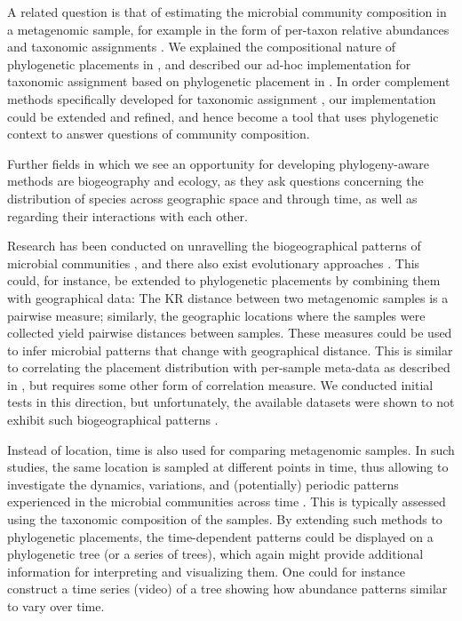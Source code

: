 A related question is that of estimating the microbial community composition in a metagenomic sample,
for example in the form of per-taxon relative abundances and taxonomic assignments \cite{Lindgreen2016}.
We explained the compositional nature of phylogenetic placements in
,
and described our ad-hoc implementation for taxonomic assignment based on phylogenetic placement in %
.
In order complement methods specifically developed for taxonomic assignment
\cite{Lindgreen2016,Sczyrba2017,Almeida2018},
our implementation could be extended and refined,
and hence become a tool that uses phylogenetic context to answer questions of community composition.


Further fields in which we see an opportunity for developing phylogeny-aware methods are biogeography and ecology,
as they ask questions concerning the distribution of species across geographic space and through time,
as well as regarding their interactions with each other.

Research has been conducted on unravelling the biogeographical patterns of microbial communities
\cite{HughesMartiny2006}, and there also exist evolutionary approaches \cite{Cox2016}.
This could, for instance, be extended to phylogenetic placements by combining them with geographical data:
The KR distance between two metagenomic samples is a pairwise measure;
similarly, the geographic locations where the samples were collected yield pairwise distances between samples.
These measures could be used to infer microbial patterns that change with geographical distance.
This is similar to correlating the placement distribution with per-sample meta-data
as described in ,
but requires some other form of correlation measure.
We conducted initial tests in this direction, but unfortunately,
the available datasets were shown to not exhibit such biogeographical patterns \cite{Lentendu2018}.

Instead of location, time is also used for comparing metagenomic samples.
In such studies, the same location is sampled at different points in time,
thus allowing to investigate the dynamics, variations, and (potentially) periodic patterns
experienced in the microbial communities across time \cite{Costello2009,Faust2015}.
This is typically assessed using the taxonomic composition of the samples.
By extending such methods to phylogenetic placements,
the time-dependent patterns could be displayed on a phylogenetic tree (or a series of trees),
which again might provide additional information for interpreting and visualizing them.
One could for instance construct a time series (video) of a tree showing
how abundance patterns similar to  vary over time.

